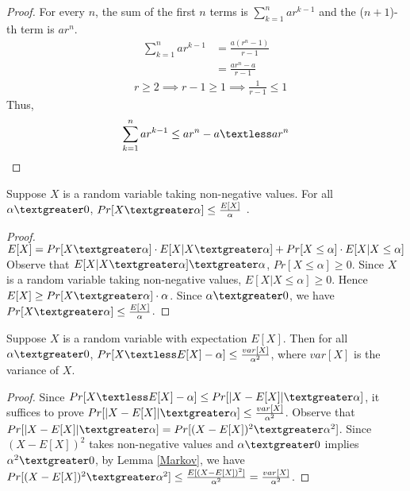 \begin{proof}
For every $n$, the sum of the first $n$ terms is $\sum_{k=1}^{n}ar^{k-1}$ and the ($n+1$)-th term is $ar^{n}$.
\begin{align}
    \nonumber \sum_{k=1}^{n}ar^{k-1}&=\frac{a(r^{n}-1)}{r-1}\\
    \nonumber &=\frac{ar^{n}-a}{r-1}
\end{align}
\begin{align}
    \nonumber &r\ge 2 \implies r-1 \ge 1 \implies \frac{1}{r-1} \le 1
\end{align}
Thus, 
\begin{align}
    \nonumber \sum_{k=1}^{n}ar^{k-1}\le ar^{n}-a \textless ar^{n}
\end{align} 
\end{proof}
\begin{lemma}\label{Markov}
Suppose $X$ is a random variable taking non-negative values. For all $\alpha \textgreater 0$, $Pr[X\textgreater \alpha ]\le \frac{E[X]}{\alpha}$ .
\end{lemma}
\begin{proof}
$E[X]=Pr[X\textgreater \alpha] \cdot E[X|X\textgreater \alpha ]+Pr[X\le \alpha]\cdot E[X|X \le \alpha]$\\
Observe that $E[X|X\textgreater \alpha ]\textgreater \alpha$, $Pr[X\le \alpha]\ge 0$.
Since $X$ is a random variable taking non-negative values, $E[X|X \le \alpha] \ge 0$.
Hence $E[X]\ge Pr[X\textgreater \alpha] \cdot \alpha $. Since $\alpha \textgreater 0$, we have $Pr[X\textgreater \alpha ]\le \frac{E[X]}{\alpha}$.
\end{proof}
\begin{lemma}\label{Chebyshev}
Suppose $X$ is a random variable with expectation $E[X]$. Then for all $\alpha \textgreater 0$, $Pr[X\textless E[X]-\alpha] \le \frac{var[X]}{\alpha^2}$, where $var[X]$ is the variance of $X$.
\end{lemma}
\begin{proof}
Since $Pr[X\textless E[X]-\alpha]\le Pr[|X-E[X]|\textgreater \alpha]$, it suffices to prove $Pr[|X-E[X]|\textgreater \alpha] \le \frac{var[X]}{\alpha^2}$.
Observe that $Pr[|X-E[X]|\textgreater \alpha]=Pr[(X-E[X])^2\textgreater \alpha^2]$. Since $(X-E[X])^2$ takes non-negative values and $\alpha \textgreater 0$ implies $\alpha^2 \textgreater 0$, by Lemma \ref{Markov}, we have $Pr[(X-E[X])^2\textgreater \alpha^2]\le \frac{E[(X-E[X])^2]}{\alpha^2}=\frac{var[X]}{\alpha^2}$.
\end{proof}
